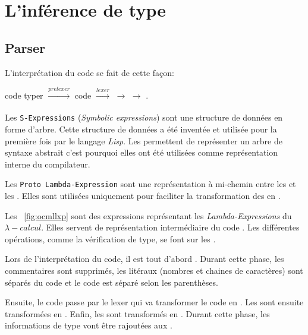 \chapter{L'inférence de type}
    \section{Parser}

            L'interprétation du code se fait de cette façon:

        \begin{center}
            code typer $\xrightarrow[]{prelexer}$ code  $\xrightarrow[]{lexer}$ \sexp{} $\xrightarrow[]{}$ \pexp{} $\xrightarrow[]{}$ \lexp.\\
        \end{center}

            Les \texttt{S-Expressions} (\textit{Symbolic expressions}) sont une structure de données en forme d'arbre.
            Cette structure de données a été inventée et utilisée pour la première fois par le langage \textit{Lisp}.
            Les \sexp{} permettent de représenter un arbre de syntaxe abstrait c'est pourquoi elles ont été utilisées
            comme représentation interne du compilateur.

            Les \texttt{Proto Lambda-Expression} sont une représentation à mi-chemin entre les \sexp{} et les \lexp{}.
            Elles sont utilisées uniquement pour faciliter la transformation des \sexp{} en \lexp{}.

            Les \lexp{}~\ref{fig:ocmllxp} sont des expressions représentant les \textit{Lambda-Expressions} du $\lambda{}-calcul$.
            Elles servent de représentation intermédiaire du code \typer{}.
            Les différentes opérations, comme la vérification de type, se font sur les \lexp{}.

            Lors de l'interprétation du code, il est tout d'abord .
            Durant cette phase, les commentaires sont supprimés, les litéraux (nombres et chaines de caractères)
            sont séparés du code et le code est séparé selon les parenthèses.

            Ensuite, le code  passe par le lexer qui va transformer le code en \sexp{}.
            Les \sexp{} sont ensuite transformées en \pexp{}.
            Enfin, les \pexp{} sont transformés en \lexp{}. Durant cette phase, les informations de type vont être rajoutées aux \lexp{}.

